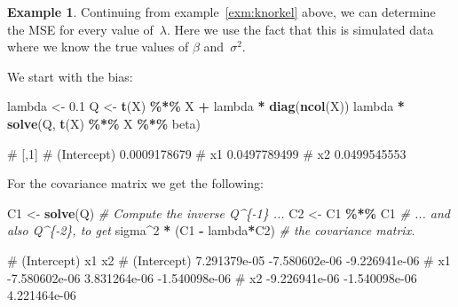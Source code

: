\documentclass[
  a4paper,
]{article}
\newenvironment{Shaded}{\begin{snugshade}}{\end{snugshade}}
\newcommand{\CommentTok}[1]{\textcolor[rgb]{0.56,0.35,0.01}{\textit{#1}}}
\newcommand{\DecValTok}[1]{\textcolor[rgb]{0.00,0.00,0.81}{#1}}
\newcommand{\FloatTok}[1]{\textcolor[rgb]{0.00,0.00,0.81}{#1}}
\newcommand{\FunctionTok}[1]{\textcolor[rgb]{0.13,0.29,0.53}{\textbf{#1}}}
\newcommand{\NormalTok}[1]{#1}
\newcommand{\OtherTok}[1]{\textcolor[rgb]{0.56,0.35,0.01}{#1}}
\newcommand{\SpecialCharTok}[1]{\textcolor[rgb]{0.81,0.36,0.00}{\textbf{#1}}}
\theoremstyle{definition}
\theoremstyle{definition}
\newtheorem{example}{Example}[section]
\theoremstyle{definition}
\theoremstyle{definition}
\theoremstyle{remark}
\begin{document}
\begin{example}
Continuing from example~\ref{exm:knorkel} above, we can determine
the MSE for every value of~\(\lambda\). Here we
use the fact that this is simulated data where we know the true
values of \(\beta\) and~\(\sigma^2\).

We start with the bias:

\begin{Shaded}
\begin{Highlighting}[]
\NormalTok{lambda }\OtherTok{\textless{}{-}} \FloatTok{0.1}
\NormalTok{Q }\OtherTok{\textless{}{-}} \FunctionTok{t}\NormalTok{(X) }\SpecialCharTok{\%*\%}\NormalTok{ X }\SpecialCharTok{+}\NormalTok{ lambda }\SpecialCharTok{*} \FunctionTok{diag}\NormalTok{(}\FunctionTok{ncol}\NormalTok{(X))}
\NormalTok{lambda }\SpecialCharTok{*} \FunctionTok{solve}\NormalTok{(Q, }\FunctionTok{t}\NormalTok{(X) }\SpecialCharTok{\%*\%}\NormalTok{ X }\SpecialCharTok{\%*\%}\NormalTok{ beta)}
\end{Highlighting}
\end{Shaded}

\begin{Shaded}
\begin{Highlighting}[]
\NormalTok{\#                     [,1]}
\NormalTok{\# (Intercept) 0.0009178679}
\NormalTok{\# x1          0.0497789499}
\NormalTok{\# x2          0.0499545553}
\end{Highlighting}
\end{Shaded}

For the covariance matrix we get the following:

\begin{Shaded}
\begin{Highlighting}[]
\NormalTok{C1 }\OtherTok{\textless{}{-}} \FunctionTok{solve}\NormalTok{(Q) }\CommentTok{\# Compute the inverse Q\^{}\{{-}1\} ...}
\NormalTok{C2 }\OtherTok{\textless{}{-}}\NormalTok{ C1 }\SpecialCharTok{\%*\%}\NormalTok{ C1 }\CommentTok{\# ... and also Q\^{}\{{-}2\}, to get}
\NormalTok{sigma}\SpecialCharTok{\^{}}\DecValTok{2} \SpecialCharTok{*}\NormalTok{ (C1 }\SpecialCharTok{{-}}\NormalTok{ lambda}\SpecialCharTok{*}\NormalTok{C2) }\CommentTok{\# the covariance matrix.}
\end{Highlighting}
\end{Shaded}

\begin{Shaded}
\begin{Highlighting}[]
\NormalTok{\#               (Intercept)            x1            x2}
\NormalTok{\# (Intercept)  7.291379e{-}05 {-}7.580602e{-}06 {-}9.226941e{-}06}
\NormalTok{\# x1          {-}7.580602e{-}06  3.831264e{-}06 {-}1.540098e{-}06}
\NormalTok{\# x2          {-}9.226941e{-}06 {-}1.540098e{-}06  4.221464e{-}06}
\end{Highlighting}
\end{Shaded}


\end{example}
\end{document}
